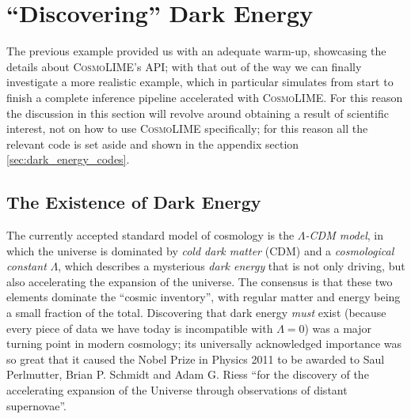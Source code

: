 \section{``Discovering'' Dark Energy}\label{sec:discovering_dark_energy}
The previous example provided us with an adequate warm-up, showcasing the details about \textsc{CosmoLIME}'s API; with that out of the way we can finally investigate a more realistic example, which in particular simulates from start to finish a complete inference pipeline accelerated with \textsc{CosmoLIME}.
For this reason the discussion in this section will revolve around obtaining a result of scientific interest, not on how to use \textsc{CosmoLIME} specifically; for this reason all the relevant code is set aside and shown in the appendix section \ref{sec:dark_energy_codes}.

\subsection{The Existence of Dark Energy}
The currently accepted standard model of cosmology is the \emph{$\Lambda$-CDM model}, in which the universe is dominated by \emph{cold dark matter} (CDM) and a \emph{cosmological constant} $\Lambda$, which describes a mysterious \emph{dark energy} that is not only driving, but also accelerating the expansion of the universe. The consensus is that these two elements dominate the ``cosmic inventory'', with regular matter and energy being a small fraction of the total.
Discovering that dark energy \emph{must} exist (because every piece of data we have today is incompatible with $\Lambda = 0$) was a major turning point in modern cosmology; its universally acknowledged importance was so great that it caused the Nobel Prize in Physics 2011 to be awarded to Saul Perlmutter, Brian P. Schmidt and Adam G. Riess ``for the discovery of the accelerating expansion of the Universe through observations of distant supernovae''.

